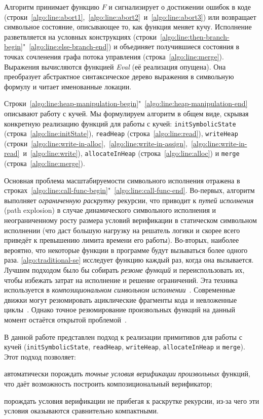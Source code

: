 Алгоритм принимает функцию $F$ и сигнализирует о достижении ошибок в коде (строки~\ref{algo:line:abort1},~\ref{algo:line:abort2}~и~\ref{algo:line:abort3}) или возвращает символьное состояние, описывающее то, как функция меняет кучу. Исполнение разветвляется на условных конструкциях (строки~\ref{algo:line:then-branch-begin}"~\ref{algo:line:else-branch-end}) и объединяет получившиеся состояния в точках сочленения графа потока управления (строка~\ref{algo:line:merge}). Выражения вычисляются функцией \emph{Eval} (её реализация опущена). Она преобразует абстрактное синтаксическое дерево выражения в символьную формулу и читает именованные локации.

Строки~\ref{algo:line:heap-manipulation-begin}"~\ref{algo:line:heap-manipulation-end} описывают работу с кучей. Мы формулируем алгоритм в общем виде, скрывая конкретную реализацию функций для работы с кучей: \texttt{initSymbolicState} (строка~\ref{algo:line:initState}), \texttt{readHeap} (строка~\ref{algo:line:read}), \texttt{writeHeap} (строки~\ref{algo:line:write-in-alloc},~\ref{algo:line:write-in-assign},~\ref{algo:line:write-in-read}~и~\ref{algo:line:write}), \texttt{allocateInHeap} (строка~\ref{algo:line:alloc}) и \texttt{merge} (строка~\ref{algo:line:merge}).

Основная проблема масштабируемости символьного исполнения отражена в строках~\ref{algo:line:call-func-begin}"~\ref{algo:line:call-func-end}. Во-первых, алгоритм выполняет \emph{ограниченную раскрутку} рекурсии, что приводит к \emph{ путей исполнения} (path explosion) в случае динамического символьного исполнения и неограниченному росту размера условий верификации в статическом символьном исполнении (что даст большую нагрузку на решатель логики и скорее всего приведёт к превышению лимита времени его работы).
Во-вторых, наиболее вероятно, что некоторые функции в программе будут вызываться более одного раза. \autoref{algo:traditional-se} исследует функцию каждый раз, когда она вызывается. Лучшим подходом было бы собирать \emph{резюме функций} и переиспользовать их, чтобы избежать затрат на исполнение и решение ограничений. Эта техника используется в \emph{композициональном символьном исполнении}~\cite{christakis2015ic,godefroid2007compositional,lin2016compositional}. Современные движки могут резюмировать ациклические фрагменты кода и невложенные циклы~\cite{xie2016proteus}. Однако точное резюмирование произвольных функций на данный момент остаётся открытой проблемой~\cite{SurveySymExec-CSUR18}.

В данной работе представлен подход к реализации примитивов для работы с кучей (\texttt{initSymbolicState}, \texttt{readHeap}, \texttt{writeHeap}, \texttt{allocateInHeap} и \texttt{merge}). Этот подход позволяет:
\begin{enumerate*}[label=\alph*)]
    \item автоматически порождать \emph{точные условия верификации} \emph{произвольных} функций, что даёт возможность построить композициональный верификатор;
    \item порождать условия верификации не прибегая к раскрутке рекурсии, из-за чего эти условия оказываются сравнительно компактными.
\end{enumerate*}

